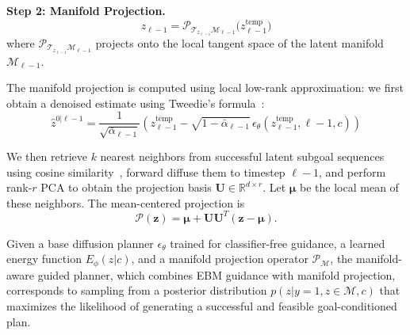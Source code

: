 \documentclass{article} %
\begin{document}
\textbf{Step 2: Manifold Projection.}
\begin{equation}
    z_{\ell-1} = \mathcal{P}_{\mathcal{T}_{z_{\ell-1}}\mathcal{M}_{\ell-1}}\big(z_{\ell-1}^{\text{temp}}\big)
\end{equation}
where $\mathcal{P}_{\mathcal{T}_{z_{\ell-1}}\mathcal{M}_{\ell-1}}$ projects onto the local tangent space of the latent manifold $\mathcal{M}_{\ell-1}$.

The manifold projection is computed using local low-rank approximation: we first obtain a denoised estimate using Tweedie's formula~\citep{robbins1992empirical,chung2022improving,chung2023diffusion}:
\begin{equation}
    \hat{z}^{0|\ell-1} = \frac{1}{\sqrt{\bar{\alpha}_{\ell-1}}}\!\left(z_{\ell-1}^{\text{temp}} - \sqrt{1-\bar{\alpha}_{\ell-1}}\,\epsilon_\theta(z_{\ell-1}^{\text{temp}}, 
    \ell\!-
    1, c)\right)
\end{equation}

We then retrieve $k$ nearest neighbors from successful latent subgoal sequences using cosine similarity~\citep{feng2024resisting}, forward diffuse them to timestep $\ell-1$, and perform rank-$r$ PCA to obtain the projection basis $\boldsymbol{U} \in \mathbb{R}^{d \times r}$. Let $\boldsymbol{\mu}$ be the local mean of these neighbors. The mean-centered projection is
\[ \mathcal{P}(\mathbf{z}) = \boldsymbol{\mu} + \boldsymbol{U}\boldsymbol{U}^T(\mathbf{z} - \boldsymbol{\mu}). \]

\begin{proposition}
    Given a base diffusion planner $\epsilon_\theta$ trained for classifier-free guidance, a learned energy function $E_\phi(z|c)$, and a manifold projection operator $\mathcal{P}_{\mathcal{M}}$, the manifold-aware guided planner, which combines EBM guidance with manifold projection, corresponds to sampling from a posterior distribution $p(z|y=1, z \in \mathcal{M}, c)$ that maximizes the likelihood of generating a successful and feasible goal-conditioned plan.
\end{proposition}
\end{document}
